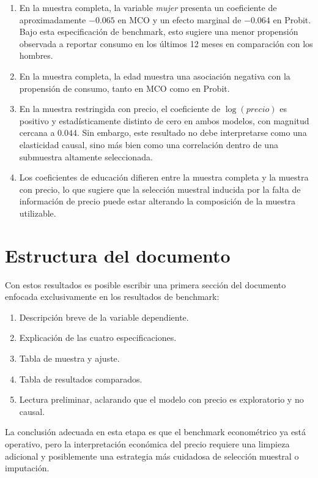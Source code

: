 \documentclass[12pt, a4paper]{article}
\begin{document}
\begin{enumerate}
    \item En la muestra completa, la variable \textit{mujer} presenta un coeficiente de aproximadamente \(-0.065\) en MCO y un efecto marginal de \(-0.064\) en Probit. Bajo esta especificación de benchmark, esto sugiere una menor propensión observada a reportar consumo en los últimos 12 meses en comparación con los hombres.
    \item En la muestra completa, la edad muestra una asociación negativa con la propensión de consumo, tanto en MCO como en Probit.
    \item En la muestra restringida con precio, el coeficiente de \(\log(precio)\) es positivo y estadísticamente distinto de cero en ambos modelos, con magnitud cercana a \(0.044\). Sin embargo, este resultado no debe interpretarse como una elasticidad causal, sino más bien como una correlación dentro de una submuestra altamente seleccionada.
    \item Los coeficientes de educación difieren entre la muestra completa y la muestra con precio, lo que sugiere que la selección muestral inducida por la falta de información de precio puede estar alterando la composición de la muestra utilizable.
\end{enumerate}

\section{Estructura del documento}

Con estos resultados es posible escribir una primera sección del documento enfocada exclusivamente en los resultados de benchmark:

\begin{enumerate}
    \item Descripción breve de la variable dependiente.
    \item Explicación de las cuatro especificaciones.
    \item Tabla de muestra y ajuste.
    \item Tabla de resultados comparados.
    \item Lectura preliminar, aclarando que el modelo con precio es exploratorio y no causal.
\end{enumerate}

La conclusión adecuada en esta etapa es que el benchmark econométrico ya está operativo, pero la interpretación económica del precio requiere una limpieza adicional y posiblemente una estrategia más cuidadosa de selección muestral o imputación.
\end{document}
